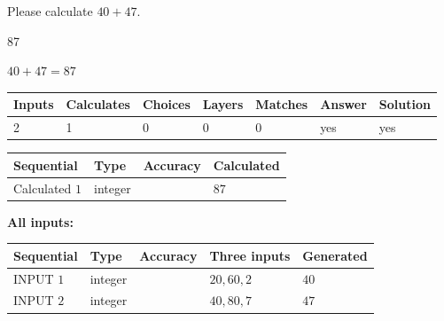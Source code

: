 \documentclass[12pt]{article}
\begin{document}
  
 
Please calculate $ %
40 +  %
47 $.
 
 
 
\noindent{}
 
 

87
 
 
\noindent{}
 
 

 
 
 
\noindent{}
 
 

$ %
40 +  %
47=   %
87$
 
 
\noindent{}
 
 

 
   
   
   
   
\noindent\begin{tabular}{|l|l|l|l|l|l|l|}
 \hline
Inputs & Calculates & Choices & Layers & Matches & Answer & Solution \\ \hline
 2  & 
 1  & 
 0
  & 
 0  & 
 0  & 
  yes & 
  yes 
  \\ \hline
 \end{tabular}
   
   
   
   
\noindent{}
   
   
  
  
\noindent\begin{tabular}{|l|l|l|l|}
\hline
 Sequential & Type & Accuracy & Calculated \\ 
\hline
 
 
  Calculated $  1 $ & integer &  & 
  $ 87 $ 
 \\  \hline  
 \end{tabular}
   
   
   
   
\noindent\vspace{0.1in}\hspace{-0.08in} {\textbf{\Large{All inputs: }}}
   
   
  
  
\noindent\begin{tabular}{|l|l|l|l|l|}
\hline
 Sequential & Type & Accuracy & Three inputs & Generated \\ 
\hline
 
 
  INPUT $  1 $ & integer &  & $
 20
 , 
 60
 , 
 2
 $ & $ 40 $ 
 \\  \hline  
 
 
  INPUT $  2 $ & integer &  & $
 40
 , 
 80
 , 
 7
 $ & $ 47 $ 
 \\  \hline  
 \end{tabular}
   
\end{document}
